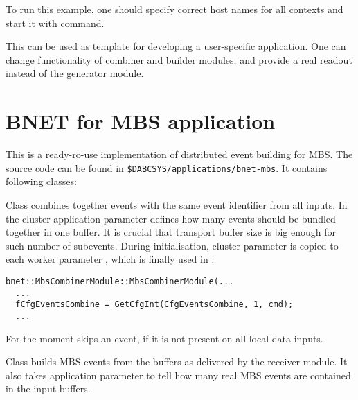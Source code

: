 To run this example, one should specify correct host names for all contexts and 
start it with  command.      

This can be used as template for developing a user-specific application.
One can change functionality of combiner and builder modules, and provide a 
real readout instead of the generator module. 


\section{BNET for MBS application}

This is a ready-ro-use implementation of distributed event building for MBS.
The source code can be found in 
{\tt \$DABCSYS/applications/bnet-mbs}. It contains following
classes:
\bbul
\item  {}
\item  {}
\item  {}
\item  {}
\ebul

Class  combines together  
events with the same event identifier from all inputs. 
In the cluster application parameter  defines how many
events should be bundled together in one buffer. It is crucial that transport
buffer size is big enough for such number of subevents. During initialisation,
cluster parameter   is copied to each
worker parameter , which is finally used in : 
   
\begin{small}
\begin{verbatim}
bnet::MbsCombinerModule::MbsCombinerModule(...  
  ...
  fCfgEventsCombine = GetCfgInt(CfgEventsCombine, 1, cmd);
  ...
\end{verbatim}
\end{small}

For the moment  skips an event, 
if it is not present on all local data inputs. 

Class  builds MBS events from
the buffers as delivered by the receiver module. It also takes 
application parameter  to tell how many real MBS events
are contained in the input buffers.
  
